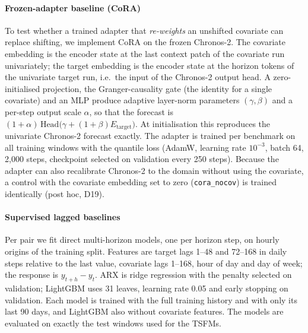 \documentclass[preprint,11pt,authoryear]{elsarticle}
\begin{document}
\paragraph{Frozen-adapter baseline (CoRA)} To test whether a trained adapter that \emph{re-weights} an unshifted covariate can replace shifting, we implement CoRA \citep{qin2025cora} on the frozen Chronos-2. The covariate embedding is the encoder state at the last context patch of the covariate run univariately; the target embedding is the encoder state at the horizon tokens of the univariate target run, i.e.\ the input of the Chronos-2 output head. A zero-initialised projection, the Granger-causality gate (the identity for a single covariate) and an MLP produce adaptive layer-norm parameters $(\gamma,\beta)$ and a per-step output scale $\alpha$, so that the forecast is $(1+\alpha)\,\mathrm{Head}\bigl(\gamma+(1+\beta)E_{\mathrm{target}}\bigr)$. At initialisation this reproduces the univariate Chronos-2 forecast exactly. The adapter is trained per benchmark on all training windows with the quantile loss (AdamW, learning rate $10^{-3}$, batch 64, 2,000 steps, checkpoint selected on validation every 250 steps). Because the adapter can also recalibrate Chronos-2 to the domain without using the covariate, a control with the covariate embedding set to zero (\texttt{cora\_nocov}) is trained identically (post hoc, D19).

\paragraph{Supervised lagged baselines} Per pair we fit direct multi-horizon models, one per horizon step, on hourly origins of the training split. Features are target lags 1--48 and 72--168 in daily steps relative to the last value, covariate lags 1--168, hour of day and day of week; the response is $y_{t+h}-y_t$. ARX is ridge regression with the penalty selected on validation; LightGBM \citep{ke2017lightgbm} uses 31 leaves, learning rate 0.05 and early stopping on validation. Each model is trained with the full training history and with only its last 90 days, and LightGBM also without covariate features. The models are evaluated on exactly the test windows used for the TSFMs.
\end{document}

